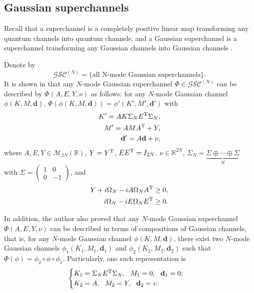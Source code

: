\documentclass[10pt,aps,pra,amsfonts,amssymb,amsmath,%
floatfix,nofootinbib, groupedaddress,superscriptaddress,citesort,twocolumn
]{revtex4}%
\begin{document}
\subsection{Gaussian superchannels}


Recall that a superchannel is a completely positive linear map transforming
any quantum channels into quantum channels; and a Gaussian superchannel is
a superchannel transforming any Gaussian channels into Gaussian channels \cite{X11}. 

Denote by 
$${ \mathcal  {GSC}}^{(N)}=\{\mbox{all  N-mode Gaussian
	superchannels}   \}.$$
It is shown in \cite{X11} that any $N$-mode Gaussian superchannel $\Phi \in{\mathcal {GSC}}^{(N)}$ can be described by $\Phi \left( {A,E,Y, \nu }\right)$ as follows:  for any $N$-mode Gaussian channel $ \phi \left( {K,M,\mathbf d} \right) $,
$\Phi \left( {\phi \left( {K, M,\mathbf d}
	\right)} \right) = \phi '\left( {K', M',\mathbf d'} \right)$ with
\begin{eqnarray*}	K' = AK\Sigma_N E^{\rm T}\Sigma_N,\\
	M' = AMA^{\rm T} + Y, \\
	\mathbf d' = A\mathbf d +  \nu ,
\end{eqnarray*}
where $ A,E,Y \in \mathcal M_{2N}(\mathbb R)$, $Y = Y^{\rm T}$, $EE^{\rm T}=
{I_{2N}}$, $ \nu  \in {\mathbb R}^{2N}$,
$\Sigma_N=\underbrace{\Sigma\oplus\cdots\oplus\Sigma}_N$ with $\Sigma= {\begin{pmatrix}
		1&0\\
		0&{ - 1}
\end{pmatrix}}$, and
\begin{eqnarray}\label{1}
	Y + i\Omega_N  - iA\Omega_N A^{\rm T} \ge 0 , \nonumber\\
	i\Omega_N  - iE\Omega_N E^{\rm T} \ge 0.
\end{eqnarray}


 In addition, the author \cite{X11} also proved that any $N$-mode Gaussian superchannel $\Phi \left( {A,E,Y, \nu }\right)$ can be described in terms of compositions of Gaussian channels, that is,  for any $N$-mode Gaussian channel  $\phi \left( {K,M,\mathbf d} \right)$,  there exist two $N$-mode Gaussian channels ${\phi_1}\left( K_1, M_1,\mathbf d_1 \right)$ and  ${\phi _2}\left(	K_2, M_2, \mathbf d_2 \right) $ such that $\Phi ( \phi )= {\phi _2} \circ \phi  \circ {\phi _1}$.
	Particularly, one such representation is
		$$\begin{cases}K_1= \Sigma_N E^{\rm T} \Sigma_N, \ \ M_1 = 0,\ \ {\mathbf d_1} = 0;\\
			K_2 = A,\ \ M_2 = Y,\ \ {\mathbf d_2} = \upsilon.
		\end{cases}$$
\end{document}
